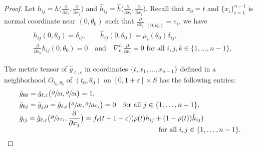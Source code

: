 \documentclass[JEP,XML,SOM,Unicode,NoFloatCountersInSection]{cedram}
\theoremstyle{definition}
\let\eps\varepsilon
\renewcommand{\>}{{\rangle}}
\newcommand{\<}{{\langle}}
\begin{document}
\begin{proof}
Let $h_{ij}=h \bigl(\frac{\partial}{\partial x_i},\frac{\partial}{\partial x_j} \bigr)$ and ${\hat h}_{ij}={\hat h} \bigl(\frac{\partial}{\partial x_i},\frac{\partial}{\partial x_j} \bigr)$. Recall that $x_0=t$ and $\{x_i\}_{i=1}^{n-1}$ is normal coordinate near $(0,\theta_0)$ such that $\frac{\partial}{\partial x_i}|_{(0,\theta_0)}=e_i$, we have
\begin{equation}\label{eq: normal_coordinates}
\begin{aligned}
&h_{ij}(0,\theta_0)=\delta_{ij}, \qquad {\hat h}_{ij}(0,\theta_0) = \mu_i(\theta_0)\delta_{ij},\\
&\frac{\partial}{\partial x_k}h_{ij}(0,\theta_0)=0 \quad \text{and} \quad \nabla^h_{e_i}\frac{\partial}{\partial x_j}=0 \text{ for all } i,j,k\in\{1,\ldots,n-1\},
\end{aligned}
\end{equation}

The metric tensor of $\hat g_{\ell,\eps}$ in coordinates $\{t, x_1,\ldots, x_{n-1}\}$ defined in a neighborhood $O_{t_0,\theta_0}$ of $(t_0,\theta_0)$ on $[0,1+\eps]\times S$ has the following entries:\vspace*{-3pt}
\begin{align*}
&\bar g_{00} = \hat g_{\ell,\eps} \bigl(\sfrac{\partial}{\partial t}, \sfrac{\partial}{\partial t} \bigr)=1,\\
&\bar g_{0j} = \bar g_{j,0}=\hat g_{\ell,\eps} \bigl(\sfrac{\partial}{\partial t},\sfrac{\partial}{\partial x_j} \bigr)=0 \quad\text{for all } j\in\{1,\ldots,n-1\},\\[-2pt]
&\bar g_{ij} = \hat g_{\ell,\eps} \bigl(\sfrac{\partial}{\partial x_i},\frac{\partial}{\partial x_j} \bigr) = f_\ell(t+1+\eps)(\rho(t)h_{ij}+(1-\rho(t))\hat h_{ij})\\[-5pt]
&\hspace*{7cm}\text{for all } i,j\in\{1,\ldots, n-1\}.
\end{align*}


\end{proof}
\end{document}
